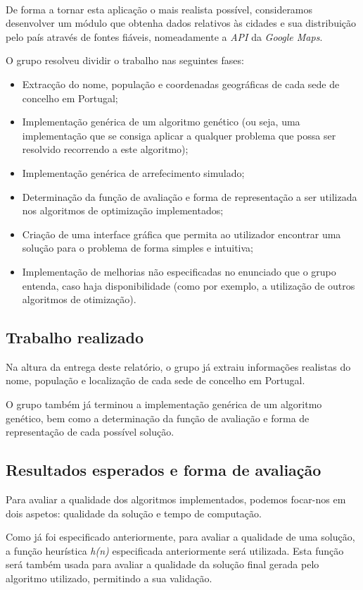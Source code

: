 \documentclass[11pt,a4paper,reqno]{article}
\numberwithin{equation}{section}
\begin{document}
\ 

De forma a tornar esta aplicação o mais realista possível, consideramos desenvolver um módulo que obtenha dados relativos às cidades e sua distribuição pelo país através de fontes fiáveis, nomeadamente a \textit{API} da \textit{Google Maps}. 

O grupo resolveu dividir o trabalho nas seguintes fases:
\begin{itemize}
\item Extracção do nome, população e coordenadas geográficas de cada sede de concelho em Portugal;
\item Implementação genérica de um algoritmo genético (ou seja, uma implementação que se consiga aplicar a qualquer problema que possa ser resolvido recorrendo a este algoritmo);
\item Implementação genérica de arrefecimento simulado;
\item Determinação da função de avaliação e forma de representação a ser utilizada nos algoritmos de optimização implementados;
\item Criação de uma interface gráfica que permita ao utilizador encontrar uma solução para o problema de forma simples e intuitiva;
\item Implementação de melhorias não especificadas no enunciado que o grupo entenda, caso haja disponibilidade (como por exemplo, a utilização de outros algoritmos de otimização).
\end{itemize}


\subsection{Trabalho realizado}
Na altura da entrega deste relatório, o grupo já extraiu informações realistas do nome, população e localização de cada sede de concelho em Portugal.

O grupo também já terminou a implementação genérica de um algoritmo genético, bem como a determinação da função de avaliação e forma de representação de cada possível solução.

\subsection{Resultados esperados e forma de avaliação}
Para avaliar a qualidade dos algoritmos implementados, podemos focar-nos em dois aspetos: qualidade da solução e tempo de computação.

Como já foi especificado anteriormente, para avaliar a qualidade de uma solução, a função heurística \textit{h(n)} especificada anteriormente será utilizada. Esta função será também usada para avaliar a qualidade da solução final gerada pelo algoritmo utilizado, permitindo a sua validação.
\end{document}
